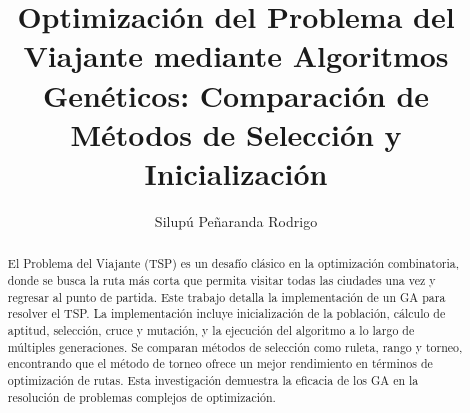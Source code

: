 \documentclass[a4paper]{article}
\begin{document}
\title{Optimización del Problema del Viajante mediante Algoritmos Genéticos: Comparación de Métodos de Selección y Inicialización}
\author{Silupú Peñaranda Rodrigo}
\maketitle

\begin{abstract}
El Problema del Viajante (TSP) es un desafío clásico en la optimización combinatoria, donde se busca la ruta más corta que permita visitar todas las ciudades una vez y regresar al punto de partida. Este trabajo detalla la implementación de un GA para resolver el TSP. La implementación incluye inicialización de la población, cálculo de aptitud, selección, cruce y mutación, y la ejecución del algoritmo a lo largo de múltiples generaciones. Se comparan métodos de selección como ruleta, rango y torneo, encontrando que el método de torneo ofrece un mejor rendimiento en términos de optimización de rutas. Esta investigación demuestra la eficacia de los GA en la resolución de problemas complejos de optimización.
\end{abstract}



 
\end{document}
